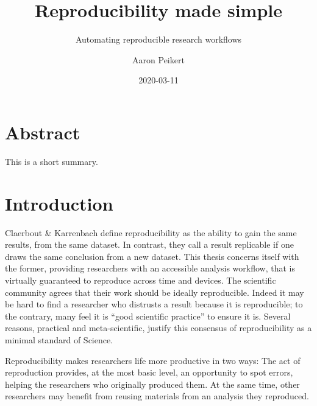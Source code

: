 \documentclass[]{book}
\title{Reproducibility made simple}
\subtitle{Automating reproducible research workflows}
\author{Aaron Peikert}
\date{2020-03-11}
\begin{document}
\maketitle

{
\setcounter{tocdepth}{1}
\tableofcontents
}
\hypertarget{abstract}{%
\chapter*{Abstract}\label{abstract}}

This is a short summary.

\hypertarget{introduction}{%
\chapter{Introduction}\label{introduction}}

Claerbout \& Karrenbach define reproducibility as the ability to gain the same results, from the same dataset.
In contrast, they call a result replicable if one draws the same conclusion from a new dataset.
This thesis concerns itself with the former, providing researchers with an accessible analysis workflow, that is virtually guaranteed to reproduce across time and devices.
The scientific community agrees that their work should be ideally reproducible.
Indeed it may be hard to find a researcher who distrusts a result because it is reproducible; to the contrary, many feel it is ``good scientific practice'' to ensure it is.
Several reasons, practical and meta-scientific, justify this consensus of reproducibility as a minimal standard of Science.

Reproducibility makes researchers life more productive in two ways:
The act of reproduction provides, at the most basic level, an opportunity to spot errors, helping the researchers who originally produced them.
At the same time, other researchers may benefit from reusing materials from an analysis they reproduced.
\end{document}
